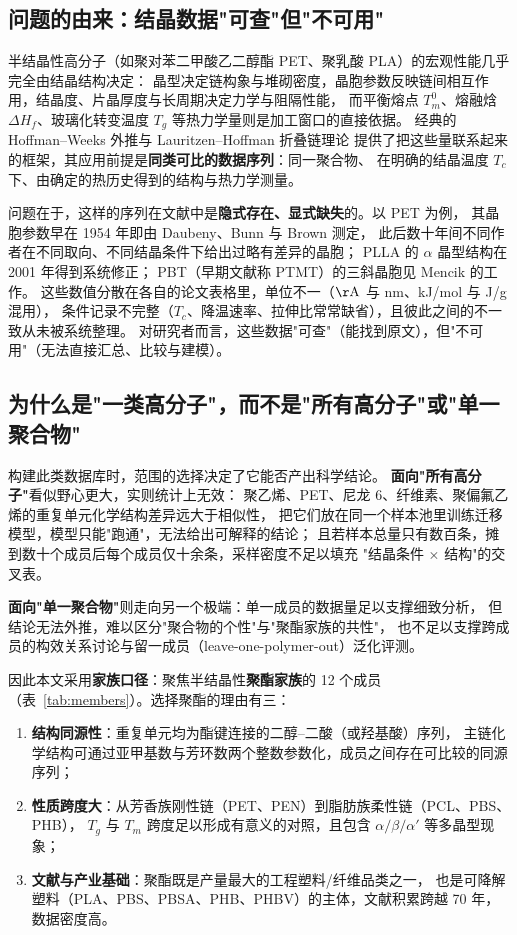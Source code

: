 \documentclass[11pt,a4paper]{ctexart}
\begin{document}
\subsection{问题的由来：结晶数据"可查"但"不可用"}

半结晶性高分子（如聚对苯二甲酸乙二醇酯 PET、聚乳酸 PLA）的宏观性能几乎完全由结晶结构决定：
晶型决定链构象与堆砌密度，晶胞参数反映链间相互作用，结晶度、片晶厚度与长周期决定力学与阻隔性能，
而平衡熔点 $T_m^0$、熔融焓 $\Delta H_f$、玻璃化转变温度 $T_g$ 等热力学量则是加工窗口的直接依据。
经典的 Hoffman--Weeks 外推\cite{hoffman1962}与 Lauritzen--Hoffman 折叠链理论\cite{lauritzen1960}
提供了把这些量联系起来的框架，其应用前提是\textbf{同类可比的数据序列}：同一聚合物、
在明确的结晶温度 $T_c$ 下、由确定的热历史得到的结构与热力学测量。

问题在于，这样的序列在文献中是\textbf{隐式存在、显式缺失}的。以 PET 为例，
其晶胞参数早在 1954 年即由 Daubeny、Bunn 与 Brown 测定\cite{daubeny1954}，
此后数十年间不同作者在不同取向、不同结晶条件下给出过略有差异的晶胞；
PLLA 的 $\alpha$ 晶型结构在 2001 年得到系统修正\cite{aleman2001}；
PBT（早期文献称 PTMT）的三斜晶胞见 Mencik 的工作\cite{mencik1975}。
这些数值分散在各自的论文表格里，单位不一（$\mathrm{\AA}$ 与 nm、kJ/mol 与 J/g 混用），
条件记录不完整（$T_c$、降温速率、拉伸比常常缺省），且彼此之间的不一致从未被系统整理。
对研究者而言，这些数据"可查"（能找到原文），但"不可用"（无法直接汇总、比较与建模）。

\subsection{为什么是"一类高分子"，而不是"所有高分子"或"单一聚合物"}

构建此类数据库时，范围的选择决定了它能否产出科学结论。
\textbf{面向"所有高分子"}看似野心更大，实则统计上无效：
聚乙烯、PET、尼龙 6、纤维素、聚偏氟乙烯的重复单元化学结构差异远大于相似性，
把它们放在同一个样本池里训练迁移模型，模型只能"跑通"，无法给出可解释的结论；
且若样本总量只有数百条，摊到数十个成员后每个成员仅十余条，采样密度不足以填充
"结晶条件 $\times$ 结构"的交叉表。

\textbf{面向"单一聚合物"}则走向另一个极端：单一成员的数据量足以支撑细致分析，
但结论无法外推，难以区分"聚合物的个性"与"聚酯家族的共性"，
也不足以支撑跨成员的构效关系讨论与留一成员（leave-one-polymer-out）泛化评测。

因此本文采用\textbf{家族口径}：聚焦半结晶性\textbf{聚酯家族}的 12 个成员
（表~\ref{tab:members}）。选择聚酯的理由有三：
\begin{enumerate}[label=(\arabic*), leftmargin=2.2em]
  \item \textbf{结构同源性}：重复单元均为酯键连接的二醇--二酸（或羟基酸）序列，
        主链化学结构可通过亚甲基数与芳环数两个整数参数化，成员之间存在可比较的同源序列；
  \item \textbf{性质跨度大}：从芳香族刚性链（PET、PEN）到脂肪族柔性链（PCL、PBS、PHB），
        $T_g$ 与 $T_m$ 跨度足以形成有意义的对照，且包含 $\alpha/\beta/\alpha'$ 等多晶型现象；
  \item \textbf{文献与产业基础}：聚酯既是产量最大的工程塑料/纤维品类之一，
        也是可降解塑料（PLA、PBS、PBSA、PHB、PHBV）的主体，文献积累跨越 70 年，数据密度高。
\end{enumerate}
\end{document}
